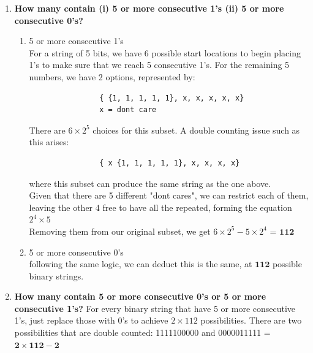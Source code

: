 \documentclass{article}
\begin{document}
    \begin{enumerate}[label=(\alph*)]
        \item \textbf{How many contain (i) 5 or more consecutive 1's (ii) 5 or more consecutive 0's?}
        \begin{enumerate}[label=(\roman*)]
            \item 5 or more consecutive 1's
            \\ For a string of 5 bits, we have 6 possible start locations to begin placing 1's to make 
            sure that we reach 5 consecutive 1's. For the remaining 5 numbers, we have 2 options, represented
            by:
            \begin{verbatim}
                { {1, 1, 1, 1, 1}, x, x, x, x, x}
                x = dont care
            \end{verbatim}
            There are $6 \times 2^5$ choices for this subset. A double counting issue such as this arises:
            \begin{verbatim}
                { x {1, 1, 1, 1, 1}, x, x, x, x}
            \end{verbatim}
            where this subset can produce the same string as the one above.\\
            Given that there are 5 different "dont cares", we can restrict each of them, leaving the other 4 free to have all the repeated, forming the equation $2^4 \times 5$\\
            Removing them from our original subset, we get $6 \times 2^5 - 5 \times 2^4$ = {\LARGE $\boxed{\mathbf{112}}$}
            \item 5 or more consecutive 0's
            \\ following the same logic, we can deduct this is the same, at {\LARGE $\boxed{\mathbf{112}}$}
            possible binary strings.
        \end{enumerate}
        \item \textbf{How many contain 5 or more consecutive 0’s or 5 or more consecutive 1’s?}
        For every binary string that have 5 or more consecutive 1's, just replace those with 0's
        to achieve $2 \times 112$ possibilities. There are two possibilities that are double
        counted: 1111100000 and 0000011111 = {\LARGE $\boxed{\mathbf{2 \times 112 - 2}}$}
    \end{enumerate}
\end{document}
